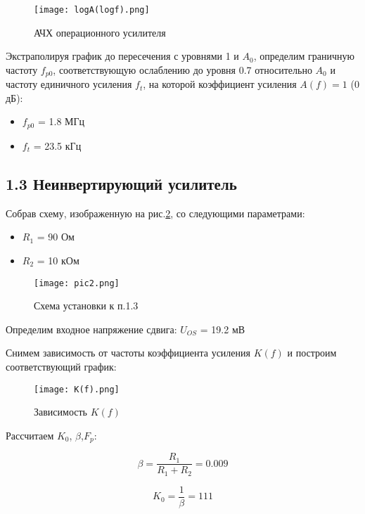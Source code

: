 \documentclass[a4paper,12pt]{report}
\begin{document}
\begin{figure}[H]
    \texttt{[image: logA(logf).png]}
    \caption{АЧХ операционного усилителя}
    \label{logA(logf)}
\end{figure}

Экстраполируя график до пересечения с уровнями 1 и $A_{0}$, определим граничную частоту $f_{p0}$, соответствующую ослаблению до уровня 0.7 относительно $A_{0}$ и частоту единичного усиления $f_{t}$, на которой коэффициент усиления $A(f) = 1$ (0 дБ):

\begin{itemize}
    \item $f_{p0}$ = 1.8 МГц
    \item $f_{t}$ = 23.5 кГц
\end{itemize}

\subsection*{1.3 Неинвертирующий усилитель}

Собрав схему, изображенную на рис.\ref{p2}, со следующими параметрами:
\begin{itemize}
    \item $R_{1}$ = 90 Ом
    \item $R_{2}$ = 10 кОм
\end{itemize}

\begin{figure}[H]
    \texttt{[image: pic2.png]}
    \caption{Схема установки к п.1.3}
    \label{p2}
\end{figure}

Определим входное напряжение сдвига: $U_{OS}$ = 19.2 мВ

Снимем зависимость от частоты коэффициента усиления $K(f)$ и построим соответствующий график:

\begin{figure}[H]
    \texttt{[image: K(f).png]}
    \caption{Зависимость $K(f)$}
    \label{logK(logf)}
\end{figure}

Рассчитаем $K_{0}$, $\beta$,$F_{p}$:

\begin{equation*}
    \beta = \frac{R_{1}}{R_{1} + R_{2}} = 0.009
\end{equation*}

\begin{equation*}
    K_{0} = \frac{1}{\beta} = 111 
\end{equation*}
\end{document}
